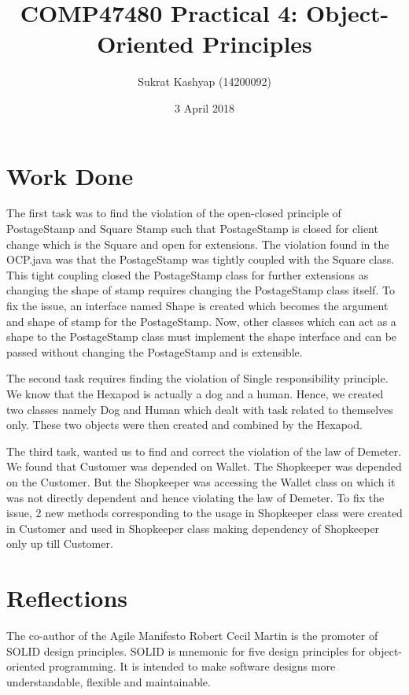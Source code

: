 \documentclass[12pt]{article}
\title{\vspace{-3.0cm}COMP47480 Practical 4: Object-Oriented Principles}
\author{Sukrat Kashyap (14200092)}
\date{3 April 2018}
\begin{document}
\maketitle

\section{Work Done}

The first task was to find the violation of the open-closed principle of PostageStamp and Square Stamp such that PostageStamp is closed for client change which is the Square and open for extensions. The violation found in the OCP.java was that the PostageStamp was tightly coupled with the Square class. This tight coupling closed the PostageStamp class for further extensions as changing the shape of stamp requires changing the PostageStamp class itself. To fix the issue, an interface named Shape is created which becomes the argument and shape of stamp for the PostageStamp. Now, other classes which can act as a shape to the PostageStamp class must implement the shape interface and can be passed without changing the PostageStamp and is extensible.

The second task requires finding the violation of Single responsibility principle. We know that the Hexapod is actually a dog and a human. Hence, we created two classes namely Dog and Human which dealt with task related to themselves only. These two objects were then created and combined by the Hexapod.

The third task, wanted us to find and correct the violation of the law of Demeter. We found that Customer was depended on Wallet. The Shopkeeper was depended on the Customer. But the Shopkeeper was accessing the Wallet class on which it was not directly dependent and hence violating the law of Demeter. To fix the issue, 2 new methods corresponding to the usage in Shopkeeper class were created in Customer and used in Shopkeeper class making dependency of Shopkeeper only up till Customer.

\section{Reflections}

The co-author of the Agile Manifesto Robert Cecil Martin is the promoter of SOLID design principles. SOLID is mnemonic for five design principles for object-oriented programming. It is intended to make software designs more understandable, flexible and maintainable.
\end{document}
